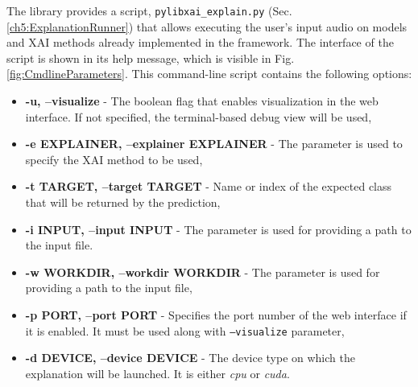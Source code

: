 \documentclass[
    bindingoffset=5mm,  %
    footnoteindent=3mm, %
    hyphenation=true    %
]{src/wut-thesis}
\begin{document}
The library provides a script, \texttt{pylibxai\_explain.py} (Sec. \ref{ch5:ExplanationRunner})
that allows executing the user’s input audio on models and XAI methods
already implemented in the framework. The interface of the script is shown
in its help message, which is visible in Fig. \ref{fig:CmdlineParameters}.
This command-line script contains the following options:
\begin{itemize}
    \item \textbf{-u, --visualize} - The boolean flag that enables visualization in the web interface.
        If not specified, the terminal-based debug view will be used,
    \item \textbf{-e EXPLAINER, --explainer EXPLAINER} - The parameter is used to specify
        the XAI method to be used,
    \item \textbf{-t TARGET, --target TARGET} - Name or index of the expected class that will be returned
        by the prediction,
    \item \textbf{-i INPUT, --input INPUT} - The parameter is used for providing a path to the input file.
    \item \textbf{-w WORKDIR, --workdir WORKDIR} - The parameter is used for providing a path to the input file,
    \item \textbf{-p PORT, --port PORT} - Specifies the port number of the web interface if it is enabled.
        It must be used along with \texttt{--visualize} parameter,
    \item \textbf{-d DEVICE, --device DEVICE} - The device type on which the explanation will be launched.
        It is either \emph{cpu} or \emph{cuda}.
\end{itemize}
\end{document}
